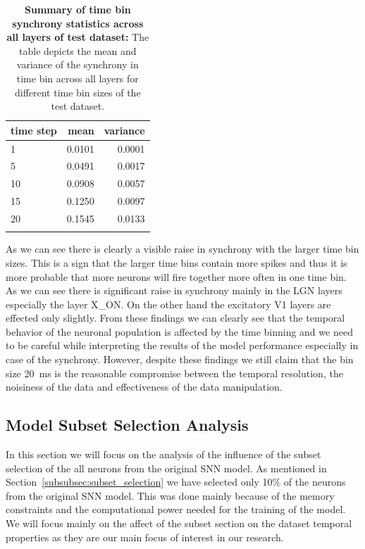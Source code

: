 \begin{table}
    \centering\footnotesize\sf
    \begin{tabular}{lrr}
    \toprule
    time step & mean & variance \\
    \midrule
    1 & 0.0101 & 0.0001 \\
    5 & 0.0491 & 0.0017 \\
    10 & 0.0908 & 0.0057 \\
    15 & 0.1250 & 0.0097 \\
    20 & 0.1545 & 0.0133 \\
    \addlinespace %
    \bottomrule
    \end{tabular}
    \caption{\textbf{Summary of time bin synchrony statistics across all layers of test dataset:} The table depicts the mean and variance of the synchrony in time bin across all layers for different time bin sizes of the test dataset.}
    \label{tab:synchrony_time_bins_summary_test}
\end{table}

As we can see there is clearly a visible raise in synchrony with the larger time bin sizes. This is a sign that the larger time bins contain more spikes and thus it is more probable that more neurons will fire together more often in one time bin. As we can see there is significant raise in synchrony mainly in the LGN layers especially the layer X\_ON. On the other hand the excitatory V1 layers are effected only slightly. From these findings we can clearly see that the temporal behavior of the neuronal population is affected by the time binning and we need to be careful while interpreting the results of the model performance especially in case of the synchrony. However, despite these findings we still claim that the bin size 20~ms is the reasonable compromise between the temporal resolution, the noisiness of the data and effectiveness of the data manipulation.


\subsection{Model Subset Selection Analysis}
\label{subsec:subset_selection_analysis}
In this section we will focus on the analysis of the influence of the subset selection of the all neurons from the original SNN model. As mentioned in Section~\ref{subsubsec:subset_selection} we have selected only 10\% of the neurons from the original SNN model. This was done mainly because of the memory constraints and the computational power needed for the training of the model. We will focus mainly on the affect of the subset section on the dataset temporal properties as they are our main focus of interest in our research.


